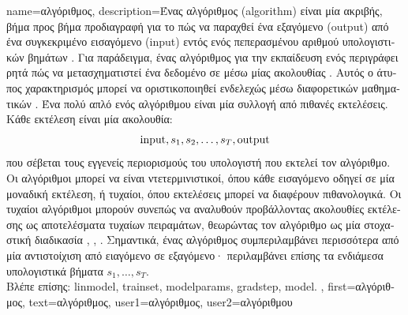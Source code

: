 {name={\foreignlanguage{greek}{αλγόριθμος}},
  description={\foreignlanguage{greek}{Ένας} \foreignlanguage{greek}{αλγόριθμος} (algorithm) \foreignlanguage{greek}{είναι μία ακριβής, βήμα προς βήμα προδιαγραφή για το πώς να παραχθεί ένα εξαγόμενο} (output) \foreignlanguage{greek}{από ένα συγκεκριμένο εισαγόμενο} (input) \foreignlanguage{greek}{εντός ενός πεπερασμένου αριθμού υπολογιστικών βημάτων} \cite{Cormen:2022aa}. 
    \foreignlanguage{greek}{Για παράδειγμα, ένας αλγόριθμος για την εκπαίδευση ενός}  \foreignlanguage{greek}{περιγράφει ρητά πώς να μετασχηματιστεί ένα δεδομένο}  \foreignlanguage{greek}{σε}  \foreignlanguage{greek}{μέσω μίας ακολουθίας} . 
    \foreignlanguage{greek}{Αυτός ο άτυπος χαρακτηρισμός μπορεί να οριστικοποιηθεί ενδελεχώς μέσω διαφορετικών μαθηματικών}  \cite{Sipser2013}. 
    \foreignlanguage{greek}{Ένα πολύ απλό}  \foreignlanguage{greek}{ενός αλγόριθμου είναι μία συλλογή από πιθανές εκτελέσεις. Κάθε εκτέλεση είναι μία ακολουθία:}
    $${\rm input},s_1,s_2,\ldots,s_T,{\rm output}$$ 
    \foreignlanguage{greek}{που σέβεται τους εγγενείς περιορισμούς του υπολογιστή που εκτελεί τον αλγόριθμο.}
	\foreignlanguage{greek}{Οι αλγόριθμοι μπορεί να είναι ντετερμινιστικοί, όπου κάθε εισαγόμενο οδηγεί σε μία μοναδική εκτέλεση, 
	ή τυχαίοι, όπου εκτελέσεις μπορεί να διαφέρουν πιθανολογικά. Οι τυχαίοι αλγόριθμοι μπορούν συνεπώς να αναλυθούν προβάλλοντας ακολουθίες εκτέλεσης ως αποτελέσματα τυχαίων πειραμάτων,
	θεωρώντας τον αλγόριθμο ως μία στοχαστική διαδικασία} \cite{BertsekasProb}, \cite{RandomizedAlgos}, \cite{Gallager13}.
	\foreignlanguage{greek}{Σημαντικά, ένας αλγόριθμος συμπεριλαμβάνει περισσότερα από μία αντιστοίχιση από ειαγόμενο σε εξαγόμενο· περιλαμβάνει επίσης τα ενδιάμεσα υπολογιστικά βήματα} 
	$s_1,\ldots,s_T$. \\
	\foreignlanguage{greek}{Βλέπε επίσης:} \gls{linmodel}, \gls{trainset}, \gls{modelparams}, \gls{gradstep}, \gls{model}.
	},
	first={\foreignlanguage{greek}{αλγόριθμος}},
	text={\foreignlanguage{greek}{αλγόριθμος}},
	user1={\foreignlanguage{greek}{αλγόριθμος}}, %
	user2={\foreignlanguage{greek}{αλγόριθμου}} %
}

